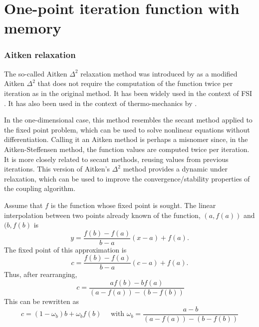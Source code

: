 \section{One-point iteration function with memory}

\subsubsection{Aitken relaxation}


The so-called Aitken \(\Delta^2\) relaxation method was introduced by \cite{irons_version_1969} as a modified Aitken \(\Delta^2\) that does not require the computation of the function twice per iteration as in the original method.
It has been widely used in the context of FSI \citep{irons_version_1969, kuttler_fixed-point_2008, joosten_analysis_2009, kuttler_vector_2009, erbts_partitioned_2015, wendt_partitioned_2015}.
It has also been used in the context of thermo-mechanics by \cite{danowski_monolithic_2013}.

In the one-dimensional case, this method resembles the secant method applied to the fixed point problem, which can be used to solve nonlinear equations without differentiation.
Calling it an Aitken method is perhaps a misnomer since, in the Aitken-Steffensen method, the function values are computed twice per iteration.
It is more closely related to secant methods, reusing values from previous iterations.
This version of Aitken's \(\Delta^2\) method provides a dynamic under relaxation, which can be used to improve the convergence/stability properties of the coupling algorithm.

Assume that \(f\) is the function whose fixed point is sought.
The linear interpolation between two points already known of the function, \((a, f(a))\) and \((b, f(b)\) is
\begin{equation}
  y = \frac{f(b)-f(a)}{b-a}(x-a) + f(a).
\end{equation}
The fixed point of this approximation is
\begin{equation}
  c = \frac{f(b)-f(a)}{b-a}(c-a) + f(a).
\end{equation}
Thus, after rearranging,
\begin{equation}\
c=\frac{a f(b)- b f(a)}{\left(a-f(a)\right)-\left(b-f(b)\right)}
\end{equation}
This can be rewritten as
\begin{equation}
c=\left(1-\omega_{b}\right) b+\omega_{b} f(b) \quad \text { with } \omega_{b}=\frac{a-b}{\left(a-f(a)\right)-\left(b-f(b)\right)}
\end{equation}

